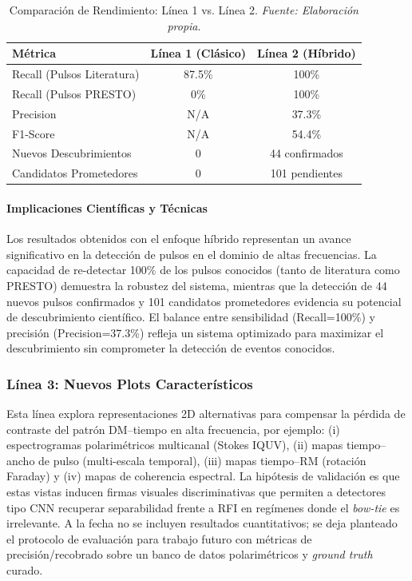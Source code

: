 \begin{table}[H]
    \centering
    \caption{Comparación de Rendimiento: Línea 1 vs. Línea 2. \textit{Fuente: Elaboración propia}.}
    \label{tab:comparacion_lineas_alma}
    \begin{tabular}{|l|c|c|}
        \hline
        \textbf{Métrica} & \textbf{Línea 1 (Clásico)} & \textbf{Línea 2 (Híbrido)} \\
        \hline
        Recall (Pulsos Literatura) & 87.5\% & 100\% \\
        \hline
        Recall (Pulsos PRESTO) & 0\% & 100\% \\
        \hline
        Precision & N/A & 37.3\% \\
        \hline
        F1-Score & N/A & 54.4\% \\
        \hline
        Nuevos Descubrimientos & 0 & 44 confirmados \\
        \hline
        Candidatos Prometedores & 0 & 101 pendientes \\
        \hline
    \end{tabular}
\end{table}

\paragraph{Implicaciones Científicas y Técnicas}

Los resultados obtenidos con el enfoque híbrido representan un avance significativo en la detección de pulsos en el dominio de altas frecuencias. La capacidad de re-detectar 100\% de los pulsos conocidos (tanto de literatura como PRESTO) demuestra la robustez del sistema, mientras que la detección de 44 nuevos pulsos confirmados y 101 candidatos prometedores evidencia su potencial de descubrimiento científico. El balance entre sensibilidad (Recall=100\%) y precisión (Precision=37.3\%) refleja un sistema optimizado para maximizar el descubrimiento sin comprometer la detección de eventos conocidos.

\subsubsection{Línea 3: Nuevos Plots Característicos}

Esta línea explora representaciones 2D alternativas para compensar la pérdida de contraste del patrón DM--tiempo en alta frecuencia, por ejemplo: (i) espectrogramas polarimétricos multicanal (Stokes IQUV), (ii) mapas tiempo--ancho de pulso (multi-escala temporal), (iii) mapas tiempo--RM (rotación Faraday) y (iv) mapas de coherencia espectral. La hipótesis de validación es que estas vistas inducen firmas visuales discriminativas que permiten a detectores tipo CNN recuperar separabilidad frente a RFI en regímenes donde el \emph{bow-tie} es irrelevante. A la fecha no se incluyen resultados cuantitativos; se deja planteado el protocolo de evaluación para trabajo futuro con métricas de precisión/recobrado sobre un banco de datos polarimétricos y \emph{ground truth} curado.

